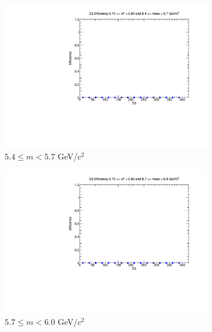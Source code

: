 \documentclass[11pt]{article}
\begin{document}
\begin{figure}[p]
\begin{subfigure}[b]{0.32\textwidth}
        \includegraphics[width=\textwidth]{./kTrackerEfficiencyPlots/D2_Efficiency_xF15_mass4.pdf}
        \caption{$5.4 \leq m < 5.7$ GeV/$c^2$}
    \end{subfigure}\hfill
    \begin{subfigure}[b]{0.32\textwidth}
        \centering
        \includegraphics[width=\textwidth]{./kTrackerEfficiencyPlots/D2_Efficiency_xF15_mass5.pdf}
        \caption{$5.7 \leq m < 6.0$ GeV/$c^2$}
    \end{subfigure}\vspace{0.5cm}
    \begin{subfigure}[b]{0.32\textwidth}
        \centering

\end{subfigure}
\end{figure}
\end{document}
